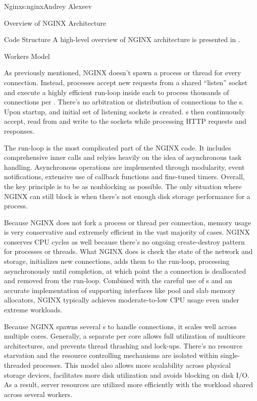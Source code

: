 \begin{aosachapter}{Nginx}{s:nginx}{Andrey Alexeev}
\begin{aosasect1}{Overview of NGINX Architecture}
\begin{aosasect2}{Code Structure}
A high-level overview of NGINX architecture is presented in
.


\end{aosasect2}

\begin{aosasect2}{Workers Model}

As previously mentioned, NGINX doesn't spawn a process or thread for
every connection. Instead,  processes accept new requests
from a shared ``listen'' socket and execute a highly efficient
run-loop inside each  to process thousands of connections
per . There's no arbitration or distribution of
connections to the s. Upon startup, and initial set of
listening sockets is created. s then continuously accept,
read from and write to the sockets while processing HTTP requests and
responses.

The run-loop is the most complicated part of the NGINX 
code. It includes comprehensive inner calls and relyies heavily on the
idea of asynchronous task handling. Asynchronous operations are
implemented through modularity, event notifications, extensive use of
callback functions and fine-tuned timers. Overall, the key principle
is to be as nonblocking as possible. The only situation where NGINX
can still block is when there's not enough disk storage performance
for a  process.

Because NGINX does not fork a process or thread per connection, memory
usage is very conservative and extremely efficient in the vast
majority of cases. NGINX conserves CPU cycles as well because there's
no ongoing create-destroy pattern for processes or threads. What NGINX
does is check the state of the network and storage, initializes new
connections, adds them to the run-loop, processing asynchronously
until completion, at which point the a connection is deallocated and
removed from the run-loop. Combined with the careful use of
s and an accurate implementation of supporting
interfaces like pool and slab memory allocators, NGINX typically
achieves moderate-to-low CPU usage even under extreme workloads.

Because NGINX spawns several s to handle connections, it
scales well across multiple cores. Generally, a separate 
per core allows full utilization of multicore architectures, and
prevents thread thrashing and lock-ups. There's no resource starvation
and the resource controlling mechanisms are isolated within
single-threaded  processes. This model also allows more
scalability across physical storage devices, facilitates more disk
utilization and avoids blocking on disk I/O. As a result, server
resources are utilized more efficiently with the workload shared
across several workers.


\end{aosasect2}
\end{aosasect1}
\end{aosachapter}
